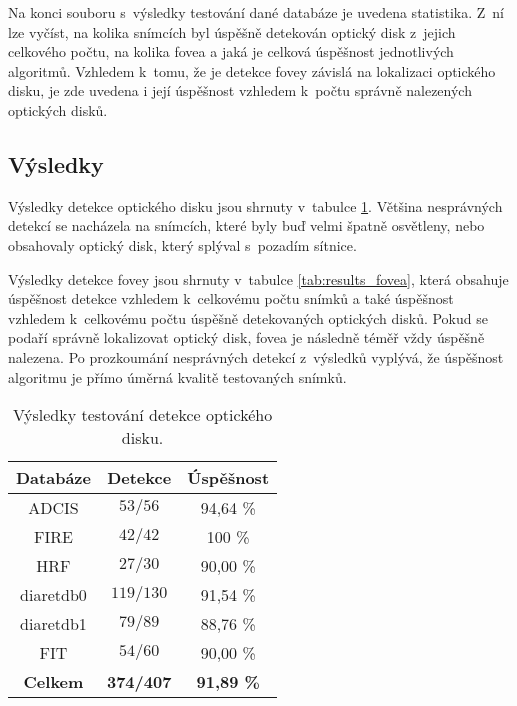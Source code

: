 Na konci souboru s~výsledky testování dané databáze je uvedena statistika. Z~ní lze vyčíst, na kolika snímcích byl úspěšně detekován optický disk z~jejich celkového počtu, na kolika fovea a jaká je celková úspěšnost jednotlivých algoritmů. Vzhledem k~tomu, že je detekce fovey závislá na lokalizaci optického disku, je zde uvedena i její úspěšnost vzhledem k~počtu správně nalezených optických disků.

\subsection*{Výsledky}
Výsledky detekce optického disku jsou shrnuty v~tabulce \ref{tab:results_od}. Většina nesprávných detekcí se nacházela na snímcích, které byly buď velmi špatně osvětleny, nebo obsahovaly optický disk, který splýval s~pozadím sítnice. 

Výsledky detekce fovey jsou shrnuty v~tabulce \ref{tab:results_fovea}, která obsahuje úspěšnost detekce vzhledem k~celkovému počtu snímků a také úspěšnost vzhledem k~celkovému počtu úspěšně detekovaných optických disků. Pokud se podaří správně lokalizovat optický disk, fovea je následně téměř vždy úspěšně nalezena. Po prozkoumání nesprávných detekcí z~výsledků vyplývá, že úspěšnost algoritmu je přímo úměrná kvalitě testovaných snímků. 

\begin{table}[ht]
  \begin{center}	
    \begin{tabular}{|c|c|c|}
      \hline
      \textbf{Databáze} & \textbf{Detekce} & \textbf{Úspěšnost}\\
      \hline
      ADCIS     & $53/56$   & 94,64 \% \\
      \hline
      FIRE      & $42/42$   & 100 \% \\
      \hline
      HRF       & $27/30$   & 90,00 \% \\
      \hline
      diaretdb0 & $119/130$ & 91,54 \% \\
      \hline
      diaretdb1 & $79/89$   & 88,76 \% \\
      \hline
      FIT       & $54/60$   & 90,00 \% \\
      \hline
      \hline
      \textbf{Celkem} & \textbf{374/407} & \textbf{91,89 \%} \\
      \hline
    \end{tabular}
  \caption{Výsledky testování detekce optického disku.}
  \label{tab:results_od}
  \end{center}
\end{table}

